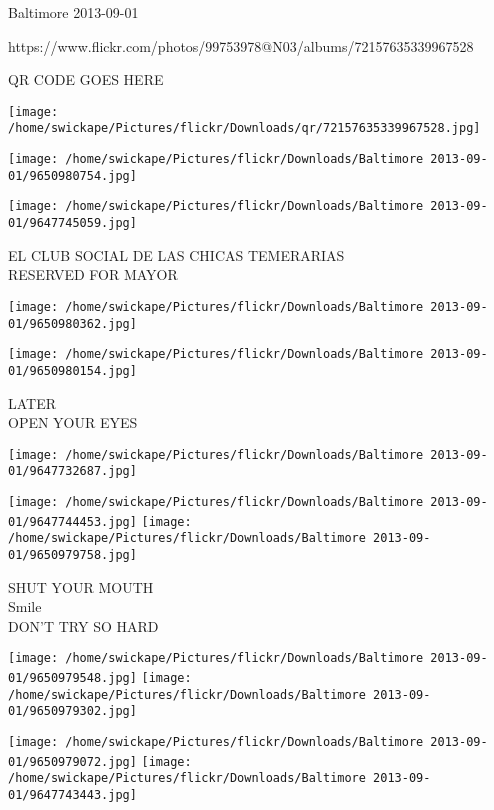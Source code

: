 \documentclass[10pt,letterpaper]{article}
\begin{document}
Baltimore 2013-09-01

https://www.flickr.com/photos/99753978@N03/albums/72157635339967528

QR CODE GOES HERE

\texttt{[image: /home/swickape/Pictures/flickr/Downloads/qr/72157635339967528.jpg]}
\pagebreak

\texttt{[image: /home/swickape/Pictures/flickr/Downloads/Baltimore 2013-09-01/9650980754.jpg]}

\vspace{0.25in}
\texttt{[image: /home/swickape/Pictures/flickr/Downloads/Baltimore 2013-09-01/9647745059.jpg]}

EL CLUB SOCIAL DE LAS CHICAS TEMERARIAS\\
RESERVED FOR MAYOR\\
\pagebreak

\texttt{[image: /home/swickape/Pictures/flickr/Downloads/Baltimore 2013-09-01/9650980362.jpg]}

\vspace{0.25in}
\texttt{[image: /home/swickape/Pictures/flickr/Downloads/Baltimore 2013-09-01/9650980154.jpg]}

LATER\\
OPEN YOUR EYES\\
\pagebreak

\texttt{[image: /home/swickape/Pictures/flickr/Downloads/Baltimore 2013-09-01/9647732687.jpg]}

\vspace{0.25in}
\texttt{[image: /home/swickape/Pictures/flickr/Downloads/Baltimore 2013-09-01/9647744453.jpg]}
\texttt{[image: /home/swickape/Pictures/flickr/Downloads/Baltimore 2013-09-01/9650979758.jpg]}

SHUT YOUR MOUTH\\
Smile\\
DON'T TRY SO HARD\\
\pagebreak

\texttt{[image: /home/swickape/Pictures/flickr/Downloads/Baltimore 2013-09-01/9650979548.jpg]}
\texttt{[image: /home/swickape/Pictures/flickr/Downloads/Baltimore 2013-09-01/9650979302.jpg]}

\texttt{[image: /home/swickape/Pictures/flickr/Downloads/Baltimore 2013-09-01/9650979072.jpg]}
\texttt{[image: /home/swickape/Pictures/flickr/Downloads/Baltimore 2013-09-01/9647743443.jpg]}
\end{document}
